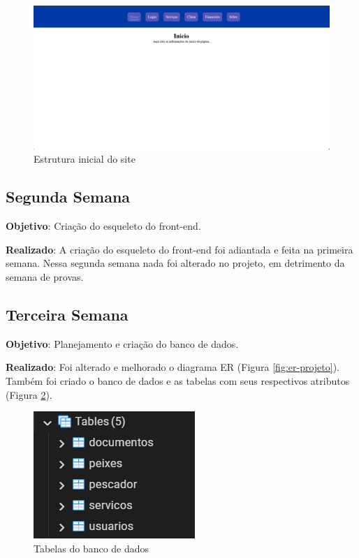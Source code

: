 \documentclass[a4paper]{abntex2}
\begin{document}
\begin{figure}[H]
    \centering
    \includegraphics[width=1.0\linewidth]{imagens/estrutura-inicial-projeto.png}
    \caption{Estrutura inicial do site}
    \label{fig:estrutura-inicial-projeto}
\end{figure}

\subsection{Segunda Semana}

\textbf{Objetivo}: Criação do esqueleto do front-end.

\textbf{Realizado}: A criação do esqueleto do front-end foi adiantada e feita na primeira semana. Nessa segunda semana nada foi alterado no projeto, em detrimento da semana de provas.

\subsection{Terceira Semana}

\textbf{Objetivo}: Planejamento e criação do banco de dados.

\textbf{Realizado}: Foi alterado e melhorado o diagrama ER (Figura \ref{fig:er-projeto}). Também foi criado o banco de dados e as tabelas com seus respectivos atributos (Figura \ref{fig:tabelas-banco-de-dados}).

\begin{figure}[H]
    \centering
    \includegraphics[width=0.5\linewidth]{imagens/tabelas-banco-de-dados.png}
    \caption{Tabelas do banco de dados}
    \label{fig:tabelas-banco-de-dados}
\end{figure}
\end{document}
